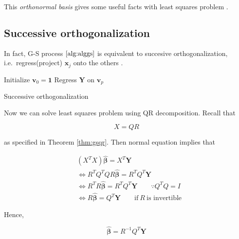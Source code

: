 \documentclass[]{book}
\theoremstyle{definition}
\theoremstyle{definition}
\theoremstyle{definition}
\theoremstyle{remark}
\begin{document}
This \emph{orthonormal basis} gives some useful facts with least squares problem \citep{Leon:2014aa}.

\hypertarget{successive-orthogonalization}{%
\subsection{Successive orthogonalization}\label{successive-orthogonalization}}

In fact, G-S process \(\ref{alg:alggs}\) is equivalent to succesive orthogonalization, i.e.~regress(project) \(\mathbf{x}_j\) onto the others \citep{Hastie:2013aa}.

\begin{algorithm} \label{alg:algorth}
  \SetAlgoLined
  Initialize $\mathbf{v}_0 = \mathbf{1}$\;
  Regress $\mathbf{Y}$ on $\mathbf{v}_p$
  \caption{Successive orthogonalization}
\end{algorithm}

Now we can solve least squares problem using QR decomposition. Recall that

\[X = QR\]

as specified in Theorem \ref{thm:gsqr}. Then normal equation implies that

\begin{equation}
  \begin{split}
    & (X^TX)\boldsymbol{\hat\beta} = X^T\mathbf{Y} \\
    & \Leftrightarrow R^TQ^TQR \boldsymbol{\hat\beta} = R^TQ^T \mathbf{Y} \\
    & \Leftrightarrow R^TR \boldsymbol{\hat\beta} = R^TQ^T \mathbf{Y} \qquad \because Q^TQ = I \\
    & \Leftrightarrow R \boldsymbol{\hat\beta} = Q^T \mathbf{Y} \qquad \text{if}\: R \:\text{is invertible}
  \end{split}
  \label{eq:qrbeta}
\end{equation}

Hence,

\begin{equation}
  \boldsymbol{\hat\beta} = R^{-1}Q^T\mathbf{Y}
  \label{eq:qrhat}
\end{equation}
\end{document}
